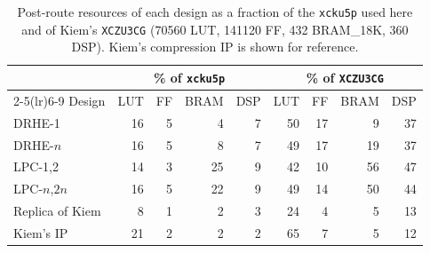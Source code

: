 \begin{table}[htbp]
\centering
\caption[Implemented resources as a fraction of two devices]{Post-route resources of each design as a fraction of the \texttt{xcku5p} used here and of Kiem's \texttt{XCZU3CG} (\num{70560} LUT, \num{141120} FF, 432 BRAM\_18K, 360 DSP). Kiem's compression IP is shown for reference.}
\label{tab:resdevice}
\small
\setlength{\tabcolsep}{4pt}
\begin{tabular}{@{}lrrrrrrrr@{}}
\toprule
& \multicolumn{4}{c}{\% of \texttt{xcku5p}} & \multicolumn{4}{c}{\% of \texttt{XCZU3CG}}\\
\cmidrule(lr){2-5}\cmidrule(lr){6-9}
Design & LUT & FF & BRAM & DSP & LUT & FF & BRAM & DSP\\
\midrule
DRHE-1 & 16 & 5 & 4 & 7 & 50 & 17 & 9 & 37\\
DRHE-$n$ & 16 & 5 & 8 & 7 & 49 & 17 & 19 & 37\\
LPC-1,2 & 14 & 3 & 25 & 9 & 42 & 10 & 56 & 47\\
LPC-$n$,$2n$ & 16 & 5 & 22 & 9 & 49 & 14 & 50 & 44\\
Replica of Kiem & 8 & 1 & 2 & 3 & 24 & 4 & 5 & 13\\
\midrule
Kiem's IP \cite{kiem2025} & 21 & 2 & 2 & 2 & 65 & 7 & 5 & 12\\
\bottomrule
\end{tabular}
\end{table}
